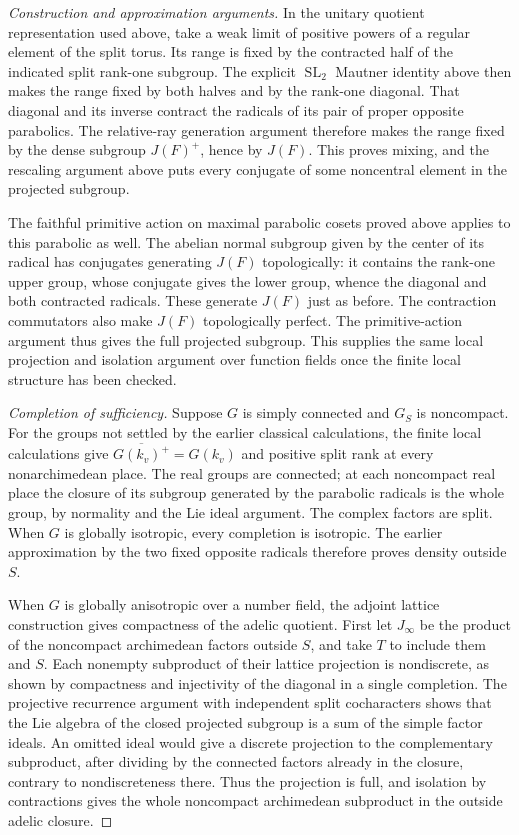 \documentclass[11pt,a4paper,openany,oneside]{book}
\theoremstyle{resultstyle}
\theoremstyle{definition}
\numberwithin{equation}{chapter}
\begin{document}
\begin{proof}[Construction and approximation arguments]
In the unitary quotient representation used above, take a
weak limit of positive powers of a regular element of the
split torus. Its range is fixed by the contracted half of
the indicated split rank-one subgroup. The explicit
\(\operatorname{SL}_2\) Mautner identity above then makes
the range fixed by both halves and by the rank-one
diagonal. That diagonal and its inverse contract the radicals
of its pair of proper opposite parabolics. The relative-ray
generation argument therefore makes the range fixed by
the dense subgroup \(J(F)^+\), hence by \(J(F)\). This proves mixing, and the rescaling
argument above puts every conjugate of some noncentral
element in the projected subgroup.

The faithful primitive action on maximal parabolic cosets
proved above applies to this parabolic as well. The abelian
normal subgroup given by the center of its radical has
conjugates generating \(J(F)\) topologically: it contains
the rank-one upper group, whose conjugate gives the lower
group, whence the diagonal and both contracted radicals.
These generate \(J(F)\) just as before. The contraction
commutators also make \(J(F)\) topologically perfect.
The primitive-action argument thus gives the full projected
subgroup. This supplies the same local projection and
isolation argument over function fields once the finite
local structure has been checked.

\medskip\noindent
\textit{Completion of sufficiency.}
Suppose \(G\) is simply connected and \(G_S\) is noncompact.
For the groups not settled by the earlier classical
calculations, the finite local calculations give
\(\overline{G(k_v)^+}=G(k_v)\) and positive split rank at every
nonarchimedean place. The real groups are connected; at each
noncompact real place the closure of its subgroup generated
by the parabolic radicals is the whole group, by normality
and the Lie ideal argument. The complex factors are split.
When \(G\) is globally isotropic, every completion is
isotropic. The earlier approximation by the two fixed
opposite radicals therefore proves density outside \(S\).

When \(G\) is globally anisotropic over a number field, the
adjoint lattice construction gives compactness of the adelic
quotient. First let \(J_\infty\) be the product of the noncompact
archimedean factors outside \(S\), and take \(T\) to include them
and \(S\). Each nonempty subproduct of their lattice projection is
nondiscrete, as shown by compactness and injectivity of the
diagonal in a single completion. The projective recurrence
argument with independent split cocharacters shows that the
Lie algebra of the closed projected subgroup is a sum of
the simple factor ideals. An omitted ideal would give a
discrete projection to the complementary subproduct,
after dividing by the connected factors already in the
closure, contrary to nondiscreteness there. Thus the
projection is full, and isolation by contractions gives the
whole noncompact archimedean subproduct in the outside
adelic closure.


\end{proof}
\end{document}
